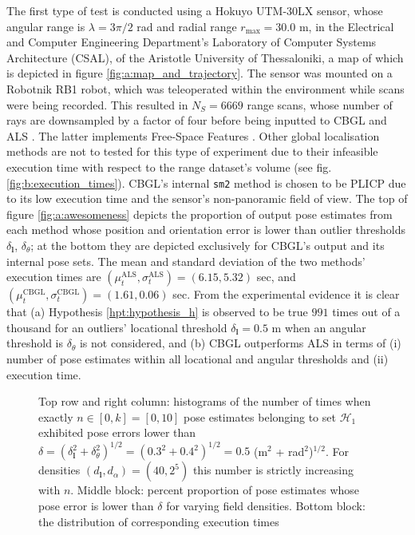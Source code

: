 The first type of test is conducted using a Hokuyo UTM-30LX sensor, whose
angular range is $\lambda = 3\pi/2$ rad and radial range $r_{\max} = 30.0$ m,
in the  Electrical and Computer Engineering Department's Laboratory of Computer
Systems Architecture (CSAL), of the Aristotle University of Thessaloniki, a map of
which is depicted in figure \ref{fig:a:map_and_trajectory}. The sensor was
mounted on a Robotnik RB1 robot, which was teleoperated within the environment
while scans were being recorded.  This resulted in $N_{S}=6669$ range scans,
whose number of rays are downsampled by a factor of four before being inputted
to CBGL and ALS \cite{als_jp}. The latter implements Free-Space Features
\cite{als_eth}. Other global localisation methods are not to tested for this
type of experiment due to their infeasible execution time with respect to the
range dataset's volume (see fig. \ref{fig:b:execution_times}). CBGL's internal
\texttt{sm2} method is chosen to be PLICP \cite{Censi2008c} due to its low
execution time and the sensor's non-panoramic field of view. The top of figure
\ref{fig:a:awesomeness} depicts the proportion of output pose estimates from
each method whose position and orientation error is lower than outlier
thresholds $\delta_{\bm{l}}$, $\delta_{\theta}$; at the bottom they are
depicted exclusively for CBGL's output and its internal pose sets.
The mean and standard deviation of the two methods' execution times are
$(\mu_t^{\text{ALS}}, \sigma_t^{\text{ALS}}) = (6.15, 5.32)$ sec, and
$(\mu_t^{\text{CBGL}}, \sigma_t^{\text{CBGL}}) = (1.61, 0.06)$ sec. From the
experimental evidence it is clear that (a) Hypothesis \ref{hpt:hypothesis_h} is
observed to be true $991$ times out of a thousand for an outliers' locational
threshold $\delta_{\bm{l}} = 0.5$ m when an angular threshold is
$\delta_{\theta}$ is not considered, and (b) CBGL outperforms ALS in terms of
(i) number of pose estimates within all locational and angular thresholds and
(ii) execution time.

\begin{figure}
  \vspace{-0.3cm}
  
  \vspace{-0.3cm}
  \caption{\small Top row and right column: histograms of the number of times
           when exactly $n \in [0,k] = [0,10]$ pose estimates belonging to set
           $\mathcal{H}_1$ exhibited pose errors lower than $\delta =
           (\delta_{\bm{l}}^2 + \delta_{\theta}^2)^{1/2} =  (0.3^2 +
           0.4^2)^{1/2} = 0.5$ (m$^2$ + rad$^2$)$^{1/2}$. For densities
           $(d_{\bm{l}},d_{\alpha}) = (40, 2^5)$ this number is strictly
           increasing with $n$. Middle block: percent proportion of pose
           estimates whose pose error is lower than $\delta$ for varying field
           densities. Bottom block: the distribution of corresponding execution
           times}
  \vspace{-0.5cm}
  \label{fig:a:determine_40_32}
\end{figure}



